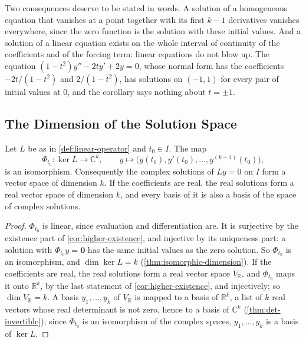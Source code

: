 Two consequences deserve to be stated in words. A solution of a homogeneous equation that vanishes at a point together with its first $k-1$ derivatives vanishes everywhere, since the zero function is the solution with these initial values. And a solution of a linear equation exists on the whole interval of continuity of the coefficients and of the forcing term: linear equations do not blow up. The equation $(1-t^2)y''-2ty'+2y=0$, whose normal form has the coefficients $-2t/(1-t^2)$ and $2/(1-t^2)$, has solutions on $(-1,1)$ for every pair of initial values at $0$, and the corollary says nothing about $t=\pm1$.

\subsection{The Dimension of the Solution Space}

\begin{theorem}
\label{thm:solution-space}
Let $L$ be as in \cref{def:linear-operator} and $t_0\in I$. The map
\[
\Phi_{t_0}\colon\ker L\to\mathbb C^k,\qquad y\mapsto\bigl(y(t_0),y'(t_0),\ldots,y^{(k-1)}(t_0)\bigr),
\]
is an isomorphism. Consequently the complex solutions of $Ly=0$ on $I$ form a vector space of dimension $k$. If the coefficients are real, the real solutions form a real vector space of dimension $k$, and every basis of it is also a basis of the space of complex solutions.
\end{theorem}

\begin{proof}
$\Phi_{t_0}$ is linear, since evaluation and differentiation are. It is surjective by the existence part of \cref{cor:higher-existence}, and injective by its uniqueness part: a solution with $\Phi_{t_0}y=\mathbf 0$ has the same initial values as the zero solution. So $\Phi_{t_0}$ is an isomorphism, and $\dim\ker L=k$ (\cref{thm:isomorphic-dimension}). If the coefficients are real, the real solutions form a real vector space $V_{\mathbb R}$, and $\Phi_{t_0}$ maps it onto $\mathbb R^k$, by the last statement of \cref{cor:higher-existence}, and injectively; so $\dim V_{\mathbb R}=k$. A basis $y_1,\ldots,y_k$ of $V_{\mathbb R}$ is mapped to a basis of $\mathbb R^k$, a list of $k$ real vectors whose real determinant is not zero, hence to a basis of $\mathbb C^k$ (\cref{thm:det-invertible}); since $\Phi_{t_0}$ is an isomorphism of the complex spaces, $y_1,\ldots,y_k$ is a basis of $\ker L$.
\end{proof}

